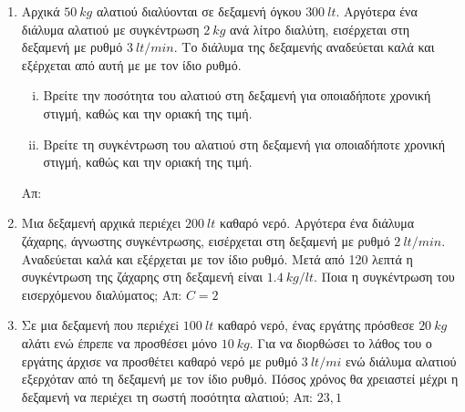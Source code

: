 \begin{enumerate}
  \item Αρχικά $ \SI{50}{kg} $ αλατιού διαλύονται σε δεξαμενή όγκου 
    $ \SI{300}{lt} $.  Αργότερα ένα διάλυμα αλατιού με συγκέντρωση 
    $ \SI{2}{kg} $ ανά λίτρο διαλύτη, εισέρχεται στη δεξαμενή με ρυθμό 
    $ \SI{3}{lt/min} $. Το διάλυμα της δεξαμενής αναδεύεται καλά και εξέρχεται από 
    αυτή με με τον ίδιο ρυθμό.
    \begin{enumerate}[i)]
      \item Βρείτε την ποσότητα του αλατιού στη δεξαμενή για οποιαδήποτε χρονική 
        στιγμή, καθώς και την οριακή της τιμή.
      \item Βρείτε τη συγκέντρωση του αλατιού στη δεξαμενή για οποιαδήποτε χρονική 
        στιγμή, καθώς και την οριακή της τιμή.
    \end{enumerate}
    \hfill Απ: 

  \item Μια δεξαμενή αρχικά περιέχει $ \SI{200}{lt} $ καθαρό νερό. Αργότερα ένα διάλυμα 
    ζάχαρης, άγνωστης συγκέντρωσης, εισέρχεται στη δεξαμενή με ρυθμό $ \SI{2}{lt/min} $. 
    Αναδεύεται καλά και εξέρχεται με τον ίδιο ρυθμό. Μετά από 120 λεπτά η συγκέντρωση της
    ζάχαρης στη δεξαμενή είναι $ \SI{1,4}{kg/lt} $. Ποια η συγκέντρωση του εισερχόμενου
    διαλύματος; 
    \hfill Απ: $ C=2 $

  \item Σε μια δεξαμενή που περιέχεi $ \SI{100}{lt} $ καθαρό νερό, ένας εργάτης πρόσθεσε 
    $ \SI{20}{kg} $ αλάτι ενώ έπρεπε να προσθέσει μόνο $ \SI{10}{kg} $. Για να διορθώσει 
    το λάθος του ο εργάτης άρχισε να προσθέτει καθαρό νερό με ρυθμό $ \SI{3}{lt/mi} $ 
    ενώ διάλυμα αλατιού εξερχόταν από τη δεξαμενή με τον ίδιο ρυθμό. Πόσος χρόνος θα
    χρειαστεί μέχρι η δεξαμενή να περιέχει τη σωστή ποσότητα αλατιού;
    \hfill Απ: $ 23,1 $ 
\end{enumerate}





